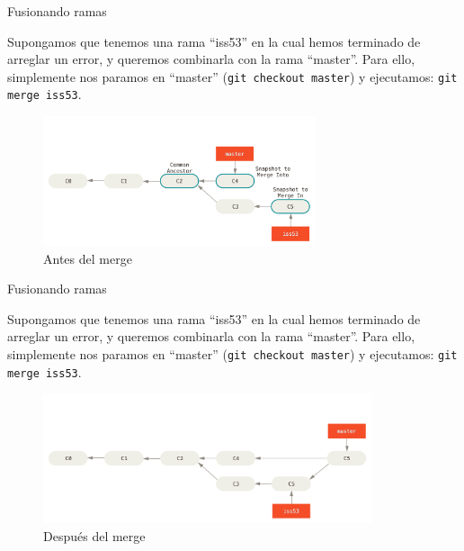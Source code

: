 \documentclass{beamer}
\begin{document}
\begin{frame}{Fusionando ramas}

    Supongamos que tenemos una rama ``iss53'' en la cual hemos terminado de arreglar un error, y queremos combinarla con la rama ``master''.
    Para ello, simplemente nos paramos en ``master'' (\texttt{git checkout master}) y ejecutamos: \texttt{git merge iss53}.

	\begin{figure}[ht]
		\begin{center}
			\includegraphics[height=1.5in]{images/basic-merging-1.png}
		\end{center}
		\caption{Antes del merge}
	\end{figure}

\end{frame}

\begin{frame}{Fusionando ramas}

    Supongamos que tenemos una rama ``iss53'' en la cual hemos terminado de arreglar un error, y queremos combinarla con la rama ``master''.
    Para ello, simplemente nos paramos en ``master'' (\texttt{git checkout master}) y ejecutamos: \texttt{git merge iss53}.

	\begin{figure}[ht]
		\begin{center}
			\includegraphics[height=1.5in]{images/basic-merging-2.png}
		\end{center}
		\caption{Después del merge}
	\end{figure}

\end{frame}
\end{document}
